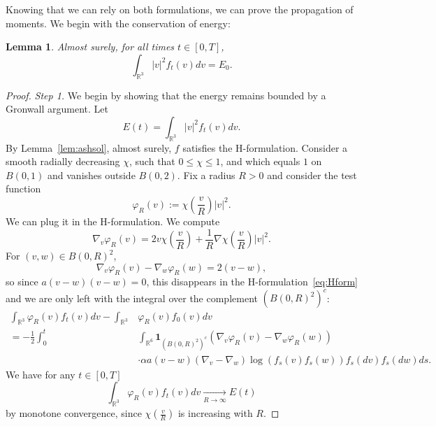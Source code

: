 \documentclass[11pt,a4paper]{article}
\theoremstyle{definition}
\theoremstyle{plain}
\newtheorem{lemma}[defi]{Lemma}
\begin{document}
Knowing that we can rely on both formulations, we can prove the propagation of moments. We begin with the conservation of energy:
\begin{lemma}
    \label{prop:propofenergy}
    Almost surely, for all times $t\in[0,T]$,
    $$\int_{\mathbb{R}^3} \vert v \vert^2f_t(v)dv =E_0.$$
\end{lemma}
\begin{proof}
    \textit{Step 1.} We begin by showing that the energy remains bounded by a Gronwall argument. Let 
    $$E(t)=\int_{\mathbb{R}^3} \vert v \vert^2f_t(v)dv.$$
    By Lemma~\ref{lem:ashsol}, almost surely, $f$ satisfies the H-formulation.
    Consider a smooth radially decreasing $\chi$, such that $0 \leq \chi \leq 1$, and which equals $1$ on $B(0,1)$ and vanishes outside $B(0,2)$. Fix a radius $R>0$ and consider the test function $$\varphi_R(v):= \chi\left(\frac{v}{R}\right)\vert v\vert^2.$$
    We can plug it in the H-formulation.
     We compute
    $$\nabla_v\varphi_R(v) = 2v \chi\left(\frac{v}{R}\right) + \frac{1}{R}\nabla\chi\left(\frac{v}{R}\right) \vert v\vert^2.$$
    For $(v,w) \in B(0,R)^2$, 
    $$\nabla_v\varphi_R(v) - \nabla_w\varphi_R(w)= 2(v-w),$$
    so since $a(v-w)(v-w)=0$, this disappears in the H-formulation~\eqref{eq:Hform} and we are only left with the integral over the complement $(B(0,R)^2)^c$:
    \begin{align}
    \label{eq:proofpropenergy1}
     \int_{\mathbb{R}^3} \varphi_R(v) f_t(v)dv-\int_{\mathbb{R}^3} &\varphi_R(v) f_0(v) dv\nonumber\\
     = -
     \frac{1}{2}\int_0^t &\int_{\mathbb{R}^6}  \mathbf{1}_{(B(0,R)^2)^c} \left( \nabla_v\varphi_R(v) - \nabla_w\varphi_R(w)\right)\\
     &\cdot \alpha a(v-w) (\nabla_v - \nabla_w)\log(f_s(v)f_s(w)) f_s(dv) f_s(dw)ds.\nonumber
    \end{align}
    We have for any $t\in[0,T]$
    $$\int_{\mathbb{R}^3} \varphi_R(v) f_t(v)dv \xrightarrow[R\rightarrow\infty]{} E(t)$$
    by monotone convergence, since $\chi\left(\frac{v}{R}\right)$ is increasing with $R$.


\end{proof}
\end{document}
